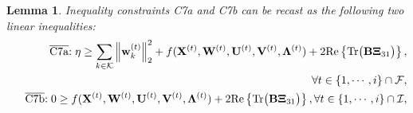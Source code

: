 \documentclass[12pt, draftclsnofoot, onecolumn]{IEEEtran}
\DeclareMathOperator{\mino}{minimize}
\newtheorem{lemma}{Lemma}
\begin{document}
\begin{lemma}
Inequality constraints C7a and C7b can be recast as the following two linear inequalities:
\begin{eqnarray}
\label{Recast_C5}
    &&\hspace*{2mm}\overline{\mathrm{C7a}}\mbox{:}\hspace*{1mm}\eta\geq \sum_{k\in\mathcal{K}}\left\|\mathbf{w}_k^{(t)}\right\|_2^2+f(\mathbf{X}^{(t)},\mathbf{W}^{(t)},\mathbf{U}^{(t)},\mathbf{V}^{(t)},\bm{\Lambda}^{(t)})+2\mathrm{Re}\left\{\mathrm{Tr}\big(\mathbf{B}\bm{\Xi}_{31}\big)\right\},\notag\\
    &&\hspace*{12mm}\forall t\in\{1,\cdots,i\}\cap\mathcal{F},\\
    &&\hspace*{2mm}\overline{\mathrm{C7b}}\mbox{:}\hspace*{1mm}0\geq f(\mathbf{X}^{(t)},\mathbf{W}^{(t)},\mathbf{U}^{(t)},\mathbf{V}^{(t)},\bm{\Lambda}^{(t)})+2\mathrm{Re}\left\{\mathrm{Tr}\big(\mathbf{B}\bm{\Xi}_{31}\big)\right\},\hspace*{0mm}\forall  t\in\{1,\cdots,i\}\cap\mathcal{I},\vspace*{-2mm}

\end{eqnarray}
\end{lemma}
\end{document}
